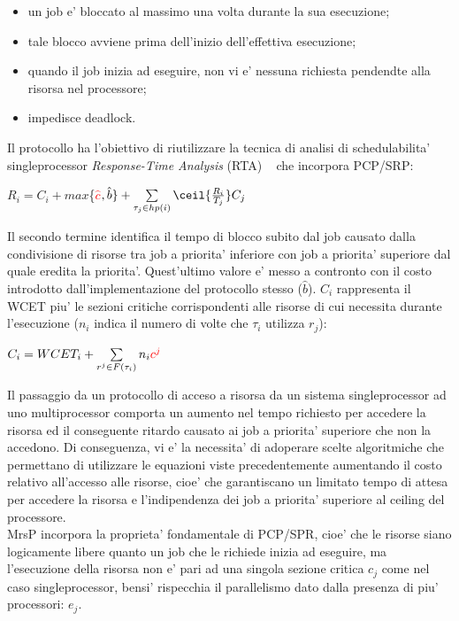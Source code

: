 \begin{itemize}
\item un job e’ bloccato al massimo una volta durante la sua esecuzione;
\item tale blocco avviene prima dell’inizio dell’effettiva esecuzione;
\item quando il job inizia ad eseguire, non vi e' nessuna richiesta pendendte alla risorsa nel processore;
\item impedisce deadlock.
\end{itemize}

Il protocollo ha l’obiettivo di riutilizzare la tecnica di analisi di schedulabilita' singleprocessor \textit{Response-Time Analysis} (RTA) ~\cite{Audsley93applyingnew} che incorpora PCP/SRP:\\

\centerline{$R_i = C_i + max$\{\textcolor{red}{$\hat{c}$}$,\hat{b}\} + \sum\limits_{\tau_j \in hp(i)} \ceil{\frac{R_i}{T_j}} C_j$}

\vspace{4 mm}

Il secondo termine identifica il tempo di blocco subito dal job causato dalla condivisione di risorse tra job a priorita’ inferiore con job a priorita’ superiore dal quale eredita la priorita’. Quest'ultimo valore e' messo a contronto con il costo introdotto dall'implementazione del protocollo stesso ($\hat{b}$). $C_i$ rappresenta il WCET piu’ le sezioni critiche corrispondenti alle risorse di cui necessita durante l’esecuzione ($n_i$ indica il numero di volte che $\tau_i$ utilizza $r_j$):\\

\centerline{$C_i = WCET_i + \sum\limits_{r^j \in F(\tau_i)} n_i \textcolor{red}{c^j}$}

\vspace{4 mm}

Il passaggio da un protocollo di acceso a risorsa da un sistema singleprocessor ad uno multiprocessor comporta un aumento nel tempo richiesto per accedere la risorsa ed il conseguente ritardo causato ai job a priorita' superiore che non la accedono. Di conseguenza, vi e' la necessita' di adoperare scelte algoritmiche che permettano di utilizzare le equazioni viste precedentemente aumentando il costo relativo all’accesso alle risorse, cioe' che garantiscano un limitato tempo di attesa per accedere la risorsa e l'indipendenza dei job a priorita' superiore al ceiling del processore.\\
MrsP incorpora la proprieta’ fondamentale di PCP/SPR, cioe’ che le risorse siano logicamente libere quanto un job che le richiede inizia ad eseguire, ma l’esecuzione della risorsa non e’ pari ad una singola sezione critica $c_j$ come nel caso singleprocessor, bensi’ rispecchia il parallelismo dato dalla presenza di piu' processori: $e_j$.\\

